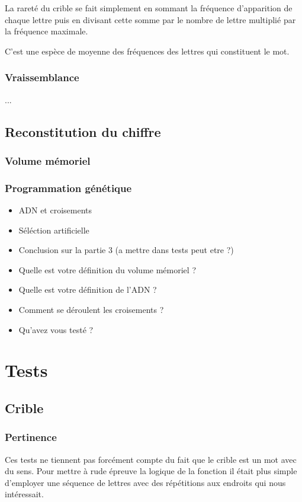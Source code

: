 \documentclass[a4paper, 11pt]{article}
\begin{document}
La rareté du crible se fait simplement en sommant la fréquence
d'apparition de chaque lettre puis en divisant cette somme par le
nombre de lettre multiplié par la fréquence maximale.

C'est une espèce de moyenne des fréquences des lettres qui constituent
le mot.
\subsubsection{Vraissemblance}
...

\subsection{Reconstitution du chiffre}

\subsubsection{Volume mémoriel}
\subsubsection{Programmation génétique}
\begin{itemize}
\item ADN et croisements
\item Séléction artificielle
\item Conclusion sur la partie 3 (a mettre dans tests peut etre ?)
\end{itemize}

\begin{itemize}
\item Quelle est votre définition du volume mémoriel ?
\item Quelle est votre définition de l'ADN ?
\item Comment se déroulent les croisements ?
\item Qu'avez vous testé ?
\end{itemize}


\section{Tests}

\subsection{Crible}

\subsubsection{Pertinence}
Ces tests ne tiennent pas forcément compte du fait que le crible est
un mot avec du sens.
Pour mettre à rude épreuve la logique de la fonction il était plus
simple d'employer une séquence de lettres avec des répétitions aux
endroits qui nous intéressait.
\end{document}
